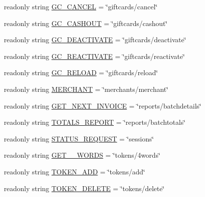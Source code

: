 \begin{DoxyCompactItemize}
\item 
readonly string \mbox{\hyperlink{class_form_sim_1_1_rest_handler_ab92584cf05cc40329fb2f2e4a5e8b33a}{G\+C\+\_\+\+C\+A\+N\+C\+EL}} = \char`\"{}giftcards/cancel\char`\"{}
\item 
readonly string \mbox{\hyperlink{class_form_sim_1_1_rest_handler_ae69e88368d469b455b3ae1105f819d08}{G\+C\+\_\+\+C\+A\+S\+H\+O\+UT}} = \char`\"{}giftcards/cashout\char`\"{}
\item 
readonly string \mbox{\hyperlink{class_form_sim_1_1_rest_handler_a806a27130463899de1a5a145b0a79c3d}{G\+C\+\_\+\+D\+E\+A\+C\+T\+I\+V\+A\+TE}} = \char`\"{}giftcards/deactivate\char`\"{}
\item 
readonly string \mbox{\hyperlink{class_form_sim_1_1_rest_handler_aee53bacfe8716e4f2e2365bb007218b5}{G\+C\+\_\+\+R\+E\+A\+C\+T\+I\+V\+A\+TE}} = \char`\"{}giftcards/reactivate\char`\"{}
\item 
readonly string \mbox{\hyperlink{class_form_sim_1_1_rest_handler_a4edb4283c69328bd540594c288c67fde}{G\+C\+\_\+\+R\+E\+L\+O\+AD}} = \char`\"{}giftcards/reload\char`\"{}
\item 
readonly string \mbox{\hyperlink{class_form_sim_1_1_rest_handler_ae4b8b267aea9f7d55eb821ae567d613b}{M\+E\+R\+C\+H\+A\+NT}} = \char`\"{}merchants/merchant\char`\"{}
\item 
readonly string \mbox{\hyperlink{class_form_sim_1_1_rest_handler_a7eaa83dfd3c17adad3483c6785bbae0b}{G\+E\+T\+\_\+\+N\+E\+X\+T\+\_\+\+I\+N\+V\+O\+I\+CE}} = \char`\"{}reports/batchdetails\char`\"{}
\item 
readonly string \mbox{\hyperlink{class_form_sim_1_1_rest_handler_a28d4f880c8894174f1f055abfc1f7b30}{T\+O\+T\+A\+L\+S\+\_\+\+R\+E\+P\+O\+RT}} = \char`\"{}reports/batchtotals\char`\"{}
\item 
readonly string \mbox{\hyperlink{class_form_sim_1_1_rest_handler_a8e0162fa484b58fc50eb95db9da2784f}{S\+T\+A\+T\+U\+S\+\_\+\+R\+E\+Q\+U\+E\+ST}} = \char`\"{}sessions\char`\"{}
\item 
readonly string \mbox{\hyperlink{class_form_sim_1_1_rest_handler_a2f8574a09fb25a8632817d26e6323daf}{G\+E\+T\+\_\+\_\+\+W\+O\+R\+DS}} = \char`\"{}tokens/4words\char`\"{}
\item 
readonly string \mbox{\hyperlink{class_form_sim_1_1_rest_handler_a6ae5956fb935833d3e68813b786bd034}{T\+O\+K\+E\+N\+\_\+\+A\+DD}} = \char`\"{}tokens/add\char`\"{}
\item 
readonly string \mbox{\hyperlink{class_form_sim_1_1_rest_handler_a4830033d986d2f15704092cd8420f04c}{T\+O\+K\+E\+N\+\_\+\+D\+E\+L\+E\+TE}} = \char`\"{}tokens/delete\char`\"{}

\end{DoxyCompactItemize}
